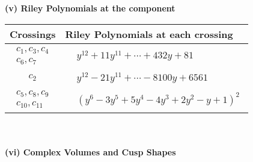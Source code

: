 \documentclass[1p]{elsarticle_modified}
\theoremstyle{definition}
\begin{document}
\newpage\renewcommand{\arraystretch}{1}
\flushleft \textbf{(v) Riley Polynomials at the component}\newline \\
\begin{tabular}{m{50pt}|m{274pt}}
Crossings & \hspace{64pt}Riley Polynomials at each crossing \\
\hline $$\begin{aligned}c_{1},c_{3},c_{4}\\c_{6},c_{7}\end{aligned}$$&$\begin{aligned}
&y^{12}+11 y^{11}+\cdots+432 y+81
\end{aligned}$\\
\hline $$\begin{aligned}c_{2}\end{aligned}$$&$\begin{aligned}
&y^{12}-21 y^{11}+\cdots-8100 y+6561
\end{aligned}$\\
\hline $$\begin{aligned}c_{5},c_{8},c_{9}\\c_{10},c_{11}\end{aligned}$$&$\begin{aligned}
&(y^6-3 y^5+5 y^4-4 y^3+2 y^2- y+1)^2
\end{aligned}$\\
\hline
\end{tabular}\\~\\
\newpage\flushleft \textbf{(vi) Complex Volumes and Cusp Shapes}
\end{document}
